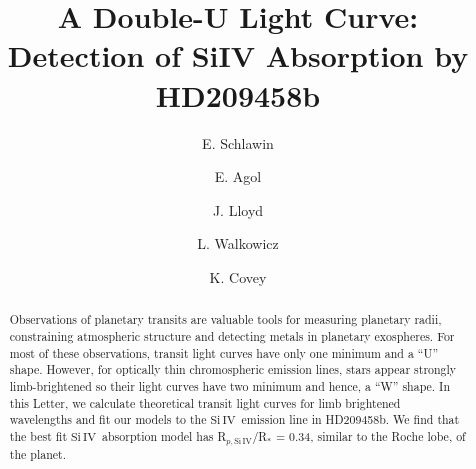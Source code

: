 \documentclass[manuscript]{aastex}
\newcommand{\siIV}{\ensuremath{\mathrm{Si}\,\scriptstyle \mathrm{IV}}}
\begin{document}

\title{A Double-U Light Curve:\\
Detection of SiIV Absorption by HD209458b}


\author{E. Schlawin} 
\author{E. Agol}
\author{J. Lloyd}
\author{L. Walkowicz}
\author{K. Covey}







\begin{abstract}
Observations of planetary transits are valuable tools for measuring planetary radii, constraining atmospheric structure and detecting metals in planetary exospheres. For most of these observations, transit light curves have only one minimum and a  ``U'' shape. However, for optically thin chromospheric emission lines, stars appear strongly limb-brightened so their light curves have two minimum and hence, a ``W'' shape. In this Letter, we calculate theoretical transit light curves for limb brightened wavelengths and fit our models to the \siIV\ emission line in HD209458b. We find that the best fit \siIV\ absorption model has R$_{p,\siIV}$/R$_*$ = 0.34, similar to the Roche lobe, of the planet.
\end{abstract}
\end{document}
